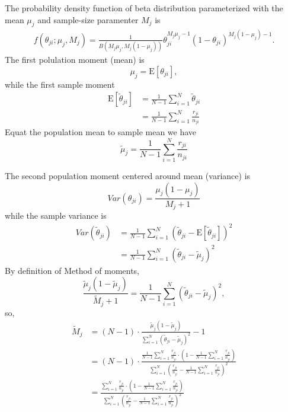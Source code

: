 \documentclass[11pt,reqno]{amsart}
\begin{document}
The probability density function of beta distribution parameterized with the mean $\mu_j$ and sample-size paramenter $M_j$ is
\begin{equation}
\begin{split}
  f(\theta_{ji};\mu_j,M_j) = \frac{1}{B(M_j\mu_j,M_j(1-\mu_j))}\theta_{ji}^{M_j\mu_j-1}(1-\theta_{ji})^{M_j(1-\mu_j)-1}.
\end{split}
\end{equation}
The first polulation moment (mean) is
\begin{equation}
 \mu_j=\text{E}[\theta_{ji}],
\end{equation}
while the first sample moment
\begin{equation}
\begin{split}
 \text{E}[\tilde{\theta}_{ji}] &= \frac{1}{N-1}\sum_{i=1}^N\tilde{\theta}_{ji}\\ &=\frac{1}{N-1}\sum_{i=1}^N\frac{r_{ji}}{n_{ji}}
\end{split}
\end{equation}
Equat the population mean to sample mean we have
\begin{equation}
 \tilde{\mu}_j =\frac{1}{N-1}\sum_{i=1}^N\frac{r_{ji}}{n_{ji}}
\end{equation}

The second population moment centered around mean (variance) is
\begin{equation}
 Var(\theta_{ji}) = \frac{\mu_j(1-\mu_j)}{M_j+1}
\end{equation}
while the sample variance is
\begin{equation}
 \begin{split}
  Var(\tilde{\theta}_{ji}) &= \frac{1}{N-1}\sum_{i=1}^N(\tilde{\theta}_{ji}-\text{E}[\tilde{\theta}_{ji}])^2\\ &= \frac{1}{N-1}\sum_{i=1}^N(\tilde{\theta}_{ji}-\tilde{\mu}_j)^2
 \end{split}
\end{equation}
By definition of Method of moments,
\begin{equation}
  \frac{\tilde{\mu}_j(1-\tilde{\mu}_j)}{\tilde{M}_j+1} = \frac{1}{N-1}\sum_{i=1}^N(\tilde{\theta}_{ji}-\tilde{\mu}_j)^2,
\end{equation}
so,
\begin{equation}
\begin{split}
 \tilde{M}_j &= (N-1)\cdot\frac{\tilde{\mu}_j(1-\tilde{\mu}_j)}{\sum_{i=1}^N(\tilde{\theta}_{ji}-\tilde{\mu}_j)^2}-1\\ &= (N-1)\cdot\frac{\frac{1}{N-1}\sum_{i=1}^N\frac{r_{ji}}{n_{ji}}\cdot\left(1-\frac{1}{N-1}\sum_{i=1}^N\frac{r_{ji}}{n_{ji}}\right)}{\sum_{i=1}^N\left(\frac{r_{ji}}{n_{ji}}-\frac{1}{N-1}\sum_{i=1}^N\frac{r_{ji}}{n_{ji}}\right)^2}\\ &= \frac{\sum_{i=1}^N\frac{r_{ji}}{n_{ji}}\cdot\left(1-\frac{1}{N-1}\sum_{i=1}^N\frac{r_{ji}}{n_{ji}}\right)}{\sum_{i=1}^N\left(\frac{r_{ji}}{n_{ji}}-\frac{1}{N-1}\sum_{i=1}^N\frac{r_{ji}}{n_{ji}}\right)^2}
\end{split}
\end{equation}
\end{document}
